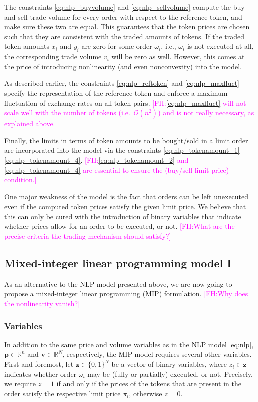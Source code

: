 \documentclass[11pt,parskip=full]{scrartcl}%
\newcommand*{\ie}{i.e., }
\newcommand*{\wrt}{with respect to }
\newcommand{\FH}[1]{\textcolor{magenta}{[FH:#1]}}
\begin{document}
The constraints \eqref{eq:nlp_buyvolume} and \eqref{eq:nlp_sellvolume} compute the buy and sell
trade volume for every order \wrt the reference token, and make sure these two are equal.
This guarantees that the token prices are chosen such that they are consistent with the traded
amounts of tokens.
If the traded token amounts $ x_i $ and $ y_i $ are zero for some order $ \omega_i $, \ie
$ \omega_i $ is not executed at all, the corresponding trade volume $ v_i $ will be zero as well.
However, this comes at the price of introducing nonlinearity (and even nonconvexity) into the
model.

As described earlier, the constraints \eqref{eq:nlp_reftoken} and \eqref{eq:nlp_maxfluct} specify
the representation of the reference token and enforce a maximum fluctuation of exchange rates on
all token pairs.
\FH{\eqref{eq:nlp_maxfluct} will not scale well with the number of tokens (i.e.\ $\mathcal O(n^2)$) and is not really necessary, as explained above.}

Finally, the limits in terms of token amounts to be bought/sold in a limit order are incorporated
into the model via the constraints \eqref{eq:nlp_tokenamount_1}--\eqref{eq:nlp_tokenamount_4}.
\FH{\eqref{eq:nlp_tokenamount_2} and \eqref{eq:nlp_tokenamount_4} are essential to ensure the (buy/sell limit price) condition.}

One major weakness of the model is the fact that orders can be left unexecuted even if the computed
token prices satisfy the given limit price.
We believe that this can only be cured with the introduction of binary variables that indicate
whether prices allow for an order to be executed, or not.
\FH{What are the precise criteria the trading mechanism should satisfy?}


\subsection{Mixed-integer linear programming model I}
\label{subsec:MIPmodel_1}

As an alternative to the NLP model presented above, we are now going to propose a
mixed-integer linear programming (MIP) formulation.
\FH{Why does the nonlinearity vanish?}

\subsubsection*{Variables}

In addition to the same price and volume variables as in the NLP model \eqref{eq:nlp},
$ \mathbf{p} \in \mathbb{R}^n $ and $ \mathbf{v} \in \mathbb{R}^N $, respectively, the MIP model
requires several other variables.
First and foremost, let $ \mathbf{z} \in \{0,1\}^N $ be a vector of binary variables, where $ z_i
\in \mathbf{z} $ indicates whether order $ \omega_i $ may be (fully or partially) executed, or not.
Precisely, we require $ z = 1 $ if and only if the prices of the tokens that are present in the
order satisfy the respective limit price $ \pi_i $, otherwise $ z = 0 $.
\end{document}
